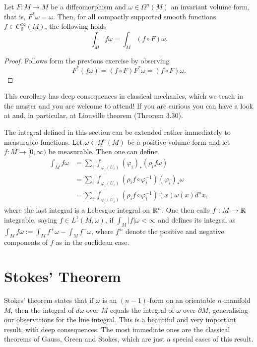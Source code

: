 \begin{corollary}
  Let $F:M\to M$ be a diffeomorphism and $\omega\in\Omega^n(M)$ an invariant volume form, that is, $F^*\omega =\omega$.
  Then, for all compactly supported smooth functions $f\in C^\infty_0(M)$, the following holds
  \begin{equation}
    \int_M f\omega = \int_M (f\circ F)\omega.
  \end{equation}
\end{corollary}
\begin{proof}
  Follows form the previous exercise by observing
  \begin{equation}
    F^*(f\omega) = (f\circ F) F^*\omega = (f\circ F)\omega.
  \end{equation}
\end{proof}

This corollary has deep consequences in classical mechanics, which we teach in the master and you are welcome to attend! If you are curious you can have a look at \cite[Chapter 3]{lectures:seri:hm} and, in particular, at Liouville theorem (Theorem 3.30).

\begin{remark}
  The integral defined in this section can be extended rather immediately to measurable functions.
  Let $\omega\in\Omega^n(M)$ be a positive volume form and let $f:M\to[0,\infty)$ be measurable.
  Then one can define
  \begin{align}
    \int_M f \omega
     & = \sum_i \int_{\varphi_i(U_i)} (\varphi_i)_*(\rho_i f\omega)                      \\
     & = \sum_i \int_{\varphi_i(U_i)} (\rho_i f \circ\varphi_i^{-1}) (\varphi_i)_*\omega \\
     & = \sum_i \int_{\varphi_i(U_i)} (\rho_i f \circ\varphi_i^{-1})(x) \omega(x) d^n x,
  \end{align}
  where the last integral is a Lebesgue integral on $\mathbb{R}^n$.
  One then calls $f:M\to \mathbb{R}$ integrable, saying $f\in L^1(M,\omega)$, if $\int_M|f|\omega < \infty$ and defines its integral as $\int_M f\omega := \int_M f^+\omega - \int_M f^-\omega$, where $f^\pm$ denote the positive and negative components of $f$ as in the euclidean case.
\end{remark}

\section{Stokes' Theorem}

Stokes' theorem states that if $\omega$ is an $(n-1)$-form on an orientable $n$-manifold $M$, then the integral of $d\omega$ over $M$ equals the integral of $\omega$ over $\partial M$, generalising our observations for the line integral.
This is a beautiful and very important result, with deep consequences. The most immediate ones are the classical theorems of Gauss, Green and Stokes, which are just a special cases of this result.

